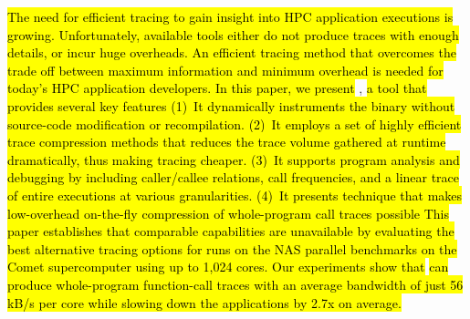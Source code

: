 \hl{The need for efficient tracing to gain insight into
HPC application executions is growing. 
%
Unfortunately, available tools either do not produce traces with enough details,
or incur huge overheads.
%
An efficient  tracing method that overcomes the trade off
between maximum information and minimum overhead
is needed for today's HPC application developers.
% 
In this paper, we present }\parlot, \hl{a tool that provides several key
features (1)~It dynamically instruments the binary without source-code modification or recompilation.
%
(2)~It employs a set of highly efficient trace compression methods that reduces the trace volume gathered at runtime dramatically, thus making tracing cheaper.
%
(3)~It supports program analysis and debugging by
including caller/callee
relations, call frequencies, and a linear trace of entire executions
at various granularities.
%
(4)~It presents technique that makes low-overhead on-the-fly compression of whole-program call traces possible
%
This paper establishes that comparable capabilities are 
unavailable by evaluating the best alternative tracing options for runs on the NAS parallel benchmarks on the
Comet supercomputer using up to 1,024 cores.
%
Our experiments show that }\parlot \hl{can produce whole-program function-call
traces with an average bandwidth of just 56 kB/s per core while 
slowing down the applications by 2.7x on average. 
}